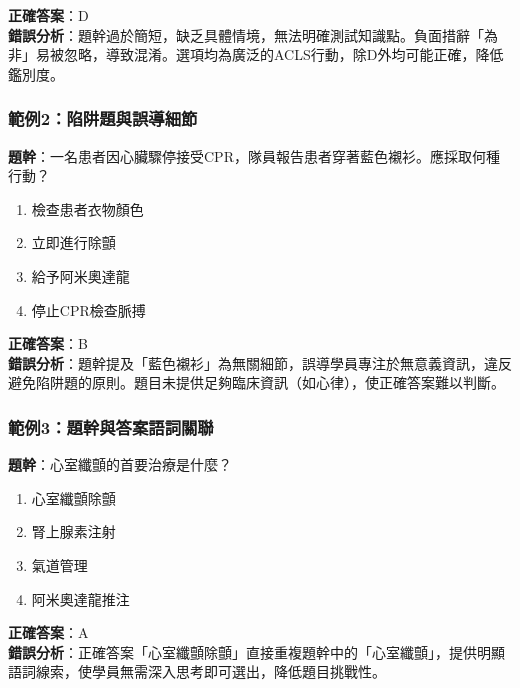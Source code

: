 \documentclass[12pt,a4paper]{article}
\begin{document}
\textbf{正確答案}：D \\
\textbf{錯誤分析}：題幹過於簡短，缺乏具體情境，無法明確測試知識點。負面措辭「為非」易被忽略，導致混淆。選項均為廣泛的ACLS行動，除D外均可能正確，降低鑑別度。

\subsubsection{範例2：陷阱題與誤導細節}
\textbf{題幹}：一名患者因心臟驟停接受CPR，隊員報告患者穿著藍色襯衫。應採取何種行動？

\begin{enumerate}[label=\Alph*.]
    \item 檢查患者衣物顏色
    \item 立即進行除顫
    \item 給予阿米奧達龍
    \item 停止CPR檢查脈搏
\end{enumerate}

\textbf{正確答案}：B \\
\textbf{錯誤分析}：題幹提及「藍色襯衫」為無關細節，誤導學員專注於無意義資訊，違反避免陷阱題的原則。題目未提供足夠臨床資訊（如心律），使正確答案難以判斷。

\subsubsection{範例3：題幹與答案語詞關聯}
\textbf{題幹}：心室纖顫的首要治療是什麼？

\begin{enumerate}[label=\Alph*.]
    \item 心室纖顫除顫
    \item 腎上腺素注射
    \item 氣道管理
    \item 阿米奧達龍推注
\end{enumerate}

\textbf{正確答案}：A \\
\textbf{錯誤分析}：正確答案「心室纖顫除顫」直接重複題幹中的「心室纖顫」，提供明顯語詞線索，使學員無需深入思考即可選出，降低題目挑戰性。

\end{document}
